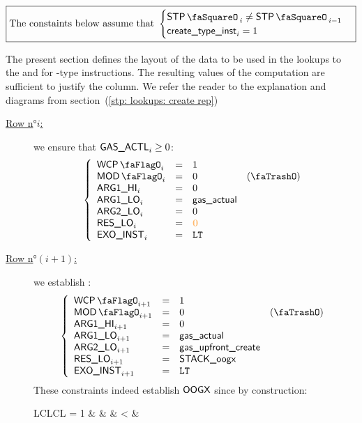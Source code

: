 \[
	\boxed{\text{The constaints below assume that }
	\begin{cases}
		\stpStamp_{i} \neq \stpStamp_{i - 1} \\
		\isCreate_{i} =    1                 \\
	\end{cases} }
\]

The present section defines the layout of the data to be used in the lookups to the \wcpMod{} and \modMod{} for -type instructions. The resulting values of the computation are sufficient to justify the \gasStipend{} column. We refer the reader to the explanation and diagrams from section~(\ref{stp: lookups: create rep})
\begin{description}
	\item[\underline{Row n$°i$:}] we ensure that $\textsf{GAS}\textsf{\_ACTL}_{i} \geq 0$:
		\[
			\left\{\begin{array}{lclc}
				\wcpLookupFlag_{i} & = & 1 \\
				\divLookupFlag_{i} & = & 0 & (\trash) \\
				\argOneHi_{i}      & = & 0 \\
				\argOneLo_{i}      & = & \locGasActl \\
				\argTwoLo_{i}      & = & 0 \\
				\resLo_{i}         & = & \zeroRes \\
				\exoInst_{i}       & = & \inst{LT} \\
			\end{array}\right.
		\]
	\item[\underline{Row n$°(i + 1)$:}] we establish \oogx:
		\[
			\left\{\begin{array}{lclc}
				\wcpLookupFlag_{i + 1} & = & 1 \\
				\divLookupFlag_{i + 1} & = & 0 & (\trash) \\
				\argOneHi_{i + 1}      & = & 0 \\
				\argOneLo_{i + 1}      & = & \locGasActl \\
				\argTwoLo_{i + 1}      & = & \locGasUpfrontCreate \\
				\resLo_{i + 1}         & = & \locOogx \\
				\exoInst_{i + 1}       & = & \inst{LT} \\
			\end{array}\right.
		\]
		\saNote{} These constraints indeed establish $\textsf{OOGX}$ since by construction:
		\begin{IEEEeqnarray*}{LCLCL}
			\locOogx = 1
			& \iff & \locGasActl    & < & \locGasUpfrontCreate            \\
		\end{IEEEeqnarray*}
\end{description}
